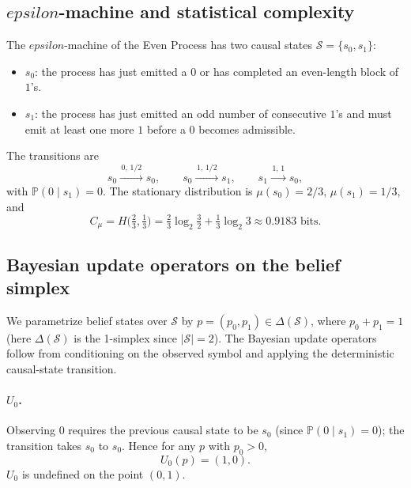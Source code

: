 \documentclass[11pt,a4paper]{article}
\def\varepsilon{epsilon}%
\theoremstyle{plain}
\theoremstyle{definition}
\theoremstyle{remark}
\newcommand{\Prob}{\mathbb{P}}
\newcommand{\States}{\mathcal{S}}
\begin{document}
\subsection{$\varepsilon$-machine and statistical complexity}

The $\varepsilon$-machine of the Even Process has two causal states $\States = \{s_0, s_1\}$:
\begin{itemize}[itemsep=2pt,topsep=2pt]
    \item $s_0$: the process has just emitted a $0$ or has completed an even-length block of $1$'s.
    \item $s_1$: the process has just emitted an odd number of consecutive $1$'s and must emit at least one more $1$ before a $0$ becomes admissible.
\end{itemize}
The transitions are
\begin{equation}
    s_0 \xrightarrow{\,0,\, 1/2\,} s_0, \qquad
    s_0 \xrightarrow{\,1,\, 1/2\,} s_1, \qquad
    s_1 \xrightarrow{\,1,\, 1\,} s_0,
\end{equation}
with $\Prob(0 \mid s_1) = 0$. The stationary distribution is $\mu(s_0) = 2/3$, $\mu(s_1) = 1/3$, and
\begin{equation}
    C_\mu = H\bigl(\tfrac{2}{3}, \tfrac{1}{3}\bigr) = \tfrac{2}{3} \log_2 \tfrac{3}{2} + \tfrac{1}{3} \log_2 3 \approx 0.9183 \text{ bits}.
\end{equation}

\subsection{Bayesian update operators on the belief simplex}

We parametrize belief states over $\States$ by $p = (p_0, p_1) \in \Delta(\States)$, where $p_0 + p_1 = 1$ (here $\Delta(\States)$ is the 1-simplex since $|\States| = 2$). The Bayesian update operators follow from conditioning on the observed symbol and applying the deterministic causal-state transition.

\paragraph{$U_0$.} Observing $0$ requires the previous causal state to be $s_0$ (since $\Prob(0 \mid s_1) = 0$); the transition takes $s_0$ to $s_0$. Hence for any $p$ with $p_0 > 0$,
\begin{equation}
    U_0(p) = (1, 0).
    \label{eq:u0-even}
\end{equation}
$U_0$ is undefined on the point $(0, 1)$.
\end{document}
